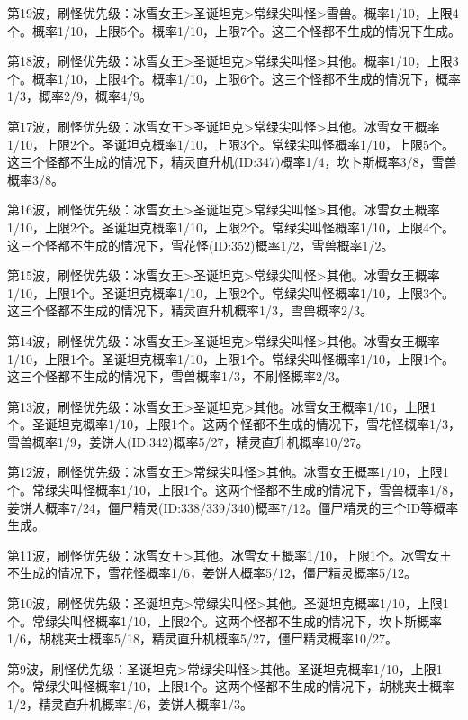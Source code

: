 第19波，刷怪优先级：冰雪女王>圣诞坦克>常绿尖叫怪>雪兽。概率1/10，上限4个。概率1/10，上限5个。概率1/10，上限7个。这三个怪都不生成的情况下生成。

第18波，刷怪优先级：冰雪女王>圣诞坦克>常绿尖叫怪>其他。概率1/10，上限3个。概率1/10，上限4个。概率1/10，上限6个。这三个怪都不生成的情况下，概率1/3，概率2/9，概率4/9。

第17波，刷怪优先级：冰雪女王>圣诞坦克>常绿尖叫怪>其他。冰雪女王概率1/10，上限2个。圣诞坦克概率1/10，上限3个。常绿尖叫怪概率1/10，上限5个。这三个怪都不生成的情况下，精灵直升机(ID:347)概率1/4，坎卜斯概率3/8，雪兽概率3/8。

第16波，刷怪优先级：冰雪女王>圣诞坦克>常绿尖叫怪>其他。冰雪女王概率1/10，上限2个。圣诞坦克概率1/10，上限2个。常绿尖叫怪概率1/10，上限4个。这三个怪都不生成的情况下，雪花怪(ID:352)概率1/2，雪兽概率1/2。

第15波，刷怪优先级：冰雪女王>圣诞坦克>常绿尖叫怪>其他。冰雪女王概率1/10，上限1个。圣诞坦克概率1/10，上限2个。常绿尖叫怪概率1/10，上限3个。这三个怪都不生成的情况下，精灵直升机概率1/3，雪兽概率2/3。

第14波，刷怪优先级：冰雪女王>圣诞坦克>常绿尖叫怪>其他。冰雪女王概率1/10，上限1个。圣诞坦克概率1/10，上限1个。常绿尖叫怪概率1/10，上限1个。这三个怪都不生成的情况下，雪兽概率1/3，不刷怪概率2/3。

第13波，刷怪优先级：冰雪女王>圣诞坦克>其他。冰雪女王概率1/10，上限1个。圣诞坦克概率1/10，上限1个。这两个怪都不生成的情况下，雪花怪概率1/3，雪兽概率1/9，姜饼人(ID:342)概率5/27，精灵直升机概率10/27。

第12波，刷怪优先级：冰雪女王>常绿尖叫怪>其他。冰雪女王概率1/10，上限1个。常绿尖叫怪概率1/10，上限1个。这两个怪都不生成的情况下，雪兽概率1/8，姜饼人概率7/24，僵尸精灵(ID:338/339/340)概率7/12。僵尸精灵的三个ID等概率生成。

第11波，刷怪优先级：冰雪女王>其他。冰雪女王概率1/10，上限1个。冰雪女王不生成的情况下，雪花怪概率1/6，姜饼人概率5/12，僵尸精灵概率5/12。

第10波，刷怪优先级：圣诞坦克>常绿尖叫怪>其他。圣诞坦克概率1/10，上限1个。常绿尖叫怪概率1/10，上限2个。这两个怪都不生成的情况下，坎卜斯概率1/6，胡桃夹士概率5/18，精灵直升机概率5/27，僵尸精灵概率10/27。

第9波，刷怪优先级：圣诞坦克>常绿尖叫怪>其他。圣诞坦克概率1/10，上限1个。常绿尖叫怪概率1/10，上限1个。这两个怪都不生成的情况下，胡桃夹士概率1/2，精灵直升机概率1/6，姜饼人概率1/3。

